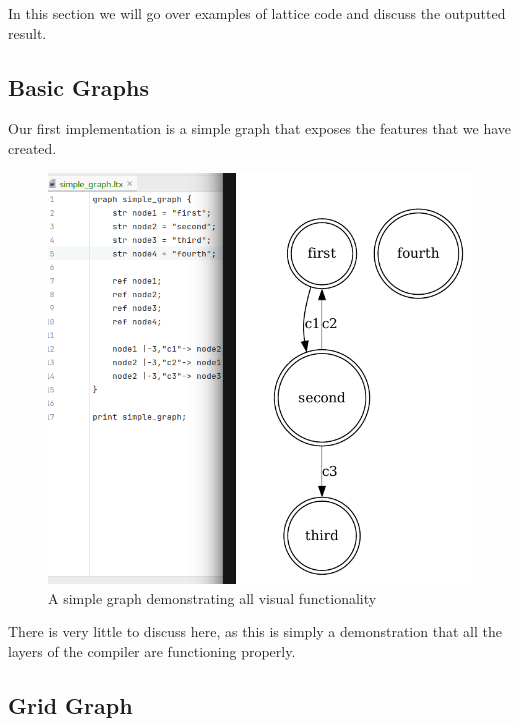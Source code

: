 In this section we will go over examples of lattice code and discuss the outputted result.

\subsection{Basic Graphs}
Our first implementation is a simple graph that exposes the features that we have created.

\begin{figure}[H]
    \centering
    \includegraphics[width=12cm]{figures/worked_example_graphs/simple-graph}
    \caption{A simple graph demonstrating all visual functionality}
    \label{fig:basic_graph_visualisation}
\end{figure}

There is very little to discuss here, as this is simply a demonstration that all the layers of the compiler are
functioning properly.

\subsection{Grid Graph}
